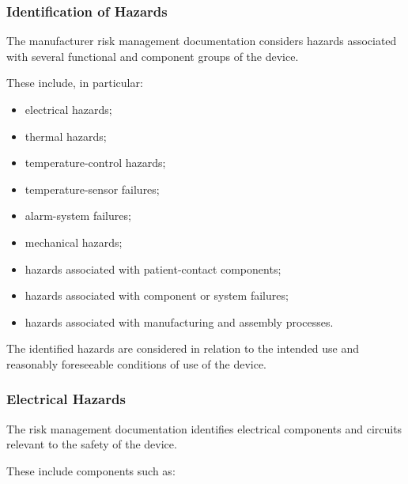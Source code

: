 \subsubsection{Identification of Hazards}

The manufacturer risk management documentation considers hazards associated
with several functional and component groups of the device.

These include, in particular:

\begin{itemize}

    \item electrical hazards;

    \item thermal hazards;

    \item temperature-control hazards;

    \item temperature-sensor failures;

    \item alarm-system failures;

    \item mechanical hazards;

    \item hazards associated with patient-contact components;

    \item hazards associated with component or system failures;

    \item hazards associated with manufacturing and assembly processes.

\end{itemize}

The identified hazards are considered in relation to the intended use and
reasonably foreseeable conditions of use of the device.

\subsubsection{Electrical Hazards}

The risk management documentation identifies electrical components and
circuits relevant to the safety of the device.

These include components such as:

